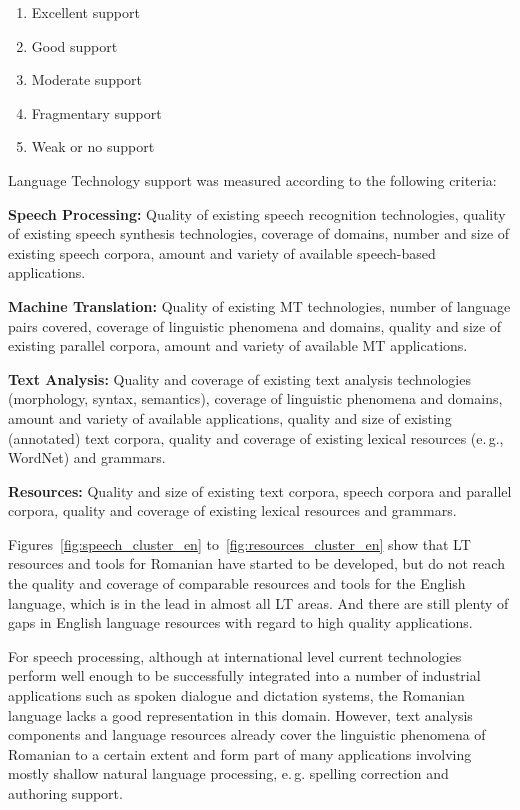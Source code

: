 \begin{multicols}{2}
\begin{enumerate}
\item Excellent support
\item Good support
\item Moderate support
\item Fragmentary support
\item Weak or no support
\end{enumerate}

Language Technology support was measured according to the following criteria:

\textbf{Speech Processing:} Quality of existing speech recognition technologies, quality of existing speech synthesis technologies, coverage of domains, number and size of existing speech corpora, amount and variety of available speech-based applications.

\textbf{Machine Translation:} Quality of existing MT technologies, number of language pairs covered, coverage of linguistic phenomena and domains, quality and size of existing parallel corpora, amount and variety of available MT applications.

\textbf{Text Analysis:} Quality and coverage of existing text analysis technologies (morphology, syntax, semantics), coverage of linguistic phenomena and domains, amount and variety of available applications, quality and size of existing (annotated) text corpora, quality and coverage of existing lexical resources (e.\,g., WordNet) and grammars.

\textbf{Resources:} Quality and size of existing text corpora, speech corpora and parallel corpora, quality and coverage of existing lexical resources and grammars.

Figures~\ref{fig:speech_cluster_en} to~\ref{fig:resources_cluster_en} show that LT resources and tools for Romanian have started to be developed, but do not reach the quality and coverage of comparable resources and tools for the English language, which is in the lead in almost all LT areas. And there are still plenty of gaps in English language resources with regard to high quality applications.

For speech processing, although at international level current technologies perform well enough to be successfully integrated into a number of industrial applications such as spoken dialogue and dictation systems, the Romanian language lacks a good representation in this domain. However, text analysis components and language resources already cover the linguistic phenomena of Romanian to a certain extent and form part of many applications involving mostly shallow natural language processing, e.\,g. spelling correction and authoring support.


\end{multicols}
